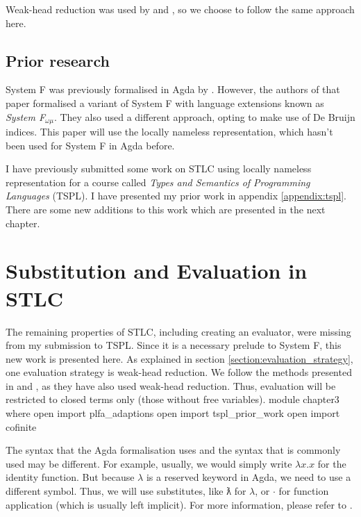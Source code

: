 \documentclass[logo,bsc,singlespacing,parskip,online]{infthesis}
\renewenvironment{code}{\mintedcopy[breaklines,breaksymbolleft=\;]{agda}}{\endmintedcopy}
\begin{document}
Weak-head reduction was used by \citet{chargueraud_locally_2012} and
\citet[chapter~Lambda]{wadler_programming_2022}, so we choose to follow the same approach here.

\section{Prior research}
System F was previously formalised in Agda by \citet{hutton_system_2019}. However, the authors of
that paper formalised a variant of System F with language extensions known as \textit{System
F$_{\omega \mu}$}. They also used a different approach, opting to make use of De Bruijn indices.
This paper will use the locally nameless representation, which hasn't been used for System F in Agda
before.

I have previously submitted some work on STLC using locally nameless representation for a course
called \textit{Types and Semantics of Programming Languages} (TSPL). I have presented my prior work in
appendix \ref{appendix:tspl}. There are some new additions to this work which are presented in the
next chapter.

\chapter{Substitution and Evaluation in STLC}
The remaining properties of STLC, including creating an evaluator, were missing from my submission
to TSPL. Since it is a necessary prelude to System F, this new work is presented here. As explained
in section \ref{section:evaluation_strategy}, one evaluation strategy is weak-head reduction. We
follow the methods presented in \citet[chapter~Properties]{wadler_programming_2022} and
\citet[section~5]{chargueraud_locally_2012}, as they have also used weak-head reduction. Thus,
evaluation will be restricted to closed terms only (those without free variables).
\begin{code}
module chapter3 where
  open import plfa_adaptions
  open import tspl_prior_work
  open import cofinite
\end{code}

The syntax that the Agda formalisation uses and the syntax that is commonly used may be different.
For example, usually, we would simply write $\lambda x. x$ for the identity function. But because
$\lambda$ is a reserved keyword in Agda, we need to use a different symbol. Thus, we will use
substitutes, like ƛ for $\lambda$, or $\cdot$ for function application (which is usually left
implicit). For more information, please refer to \citet{wadler_programming_2022}.
\end{document}
